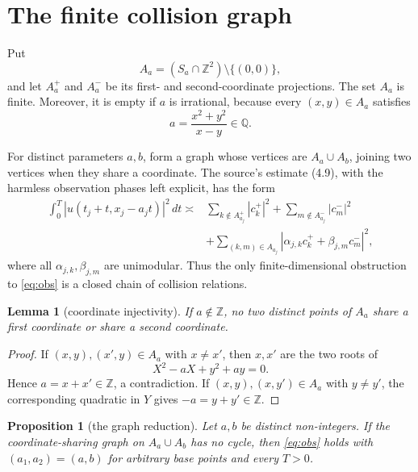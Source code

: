 \documentclass[11pt]{article}
\newtheorem{lemma}{Lemma}
\newtheorem{proposition}{Proposition}
\newcommand{\Z}{\mathbb Z}
\begin{document}
\section{The finite collision graph}

Put
\[
 A_a=(S_a\cap\Z^2)\setminus\{(0,0)\},
\]
and let $A_a^+$ and $A_a^-$ be its first- and second-coordinate projections.
The set $A_a$ is finite.  Moreover, it is empty if $a$ is irrational, because
every $(x,y)\in A_a$ satisfies
\begin{equation}\label{eq:parameter}
 a=\frac{x^2+y^2}{x-y}\in\mathbb Q.
\end{equation}

For distinct parameters $a,b$, form a graph whose vertices are
$A_a\cup A_b$, joining two vertices when they share a coordinate.  The
source's estimate (4.9), with the harmless observation phases left explicit,
has the form
\begin{align}\label{eq:source-reduction}
 \int_0^T|u(t_j+t,x_j-a_jt)|^2\,dt\asymp{}&
 \sum_{k\notin A_{a_j}^+}|c_k^+|^2+
 \sum_{m\notin A_{a_j}^-}|c_m^-|^2\\
 &+\sum_{(k,m)\in A_{a_j}}
 |\alpha_{j,k}c_k^++\beta_{j,m}c_m^-|^2,
 \nonumber
\end{align}
where all $\alpha_{j,k},\beta_{j,m}$ are unimodular.  Thus the only
finite-dimensional obstruction to \eqref{eq:obs} is a closed chain of
collision relations.

\begin{lemma}[coordinate injectivity]\label{lem:injectivity}
If $a\notin\Z$, no two distinct points of $A_a$ share a first coordinate or
share a second coordinate.
\end{lemma}

\begin{proof}
If $(x,y),(x',y)\in A_a$ with $x\ne x'$, then $x,x'$ are the two roots of
\[
 X^2-aX+y^2+ay=0.
\]
Hence $a=x+x'\in\Z$, a contradiction.  If $(x,y),(x,y')\in A_a$ with
$y\ne y'$, the corresponding quadratic in $Y$ gives
$-a=y+y'\in\Z$.
\end{proof}

\begin{proposition}[the graph reduction]\label{prop:graph}
Let $a,b$ be distinct non-integers.  If the coordinate-sharing graph on
$A_a\cup A_b$ has no cycle, then \eqref{eq:obs} holds with
$(a_1,a_2)=(a,b)$ for arbitrary base points and every $T>0$.
\end{proposition}
\end{document}
